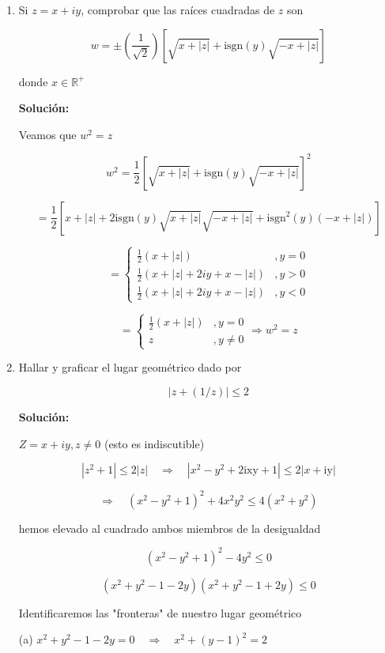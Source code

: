 \documentclass[a4paper,12pt]{article}
\begin{document}
\begin{enumerate}
    \item Si \( z = x + iy \), comprobar que las raíces cuadradas de \( z \) son

\[ w = \pm \left( \frac{1}{\sqrt{2}} \right) [ \sqrt{x + |z|} + \text{isgn}(y) \sqrt{-x + |z|} ] \]

donde \( x \in \mathbb{R}^+ \)

\textbf{Solución:}

Veamos que \( w^2 = z \)

\[ w^2 = \frac{1}{2} [ \sqrt{x + |z|} + \text{isgn}(y) \sqrt{-x + |z|} ]^2 \]

\[ = \frac{1}{2} [ x + |z| + 2 \text{isgn}(y) \sqrt{x + |z|} \sqrt{-x + |z|} + \text{isgn}^2(y) (-x + |z|) ] \]

\[ = \begin{cases}
\frac{1}{2} ( x + |z| ) & , y = 0 \\
\frac{1}{2} ( x + |z| + 2iy + x - |z| ) & , y > 0 \\
\frac{1}{2} ( x + |z| + 2iy + x - |z| ) & , y < 0
\end{cases} \]

\[ = \begin{cases}
\frac{1}{2} ( x + |z| ) & , y = 0 \\
z & , y \neq 0
\end{cases} \Rightarrow w^2 = z \]

    \item Hallar y graficar el lugar geométrico dado por

\[ | z + (1 / z) | \leq 2 \]

\textbf{Solución:}

\( Z = x + iy, z \neq 0 \) (esto es indiscutible)


\[ \left| z^2 + 1 \right| \leq 2 \left| z \right| \quad \Rightarrow \quad \left| x^2 - y^2 + 2 \text{ixy} + 1 \right| \leq 2 \left| x + \text{iy} \right| \]

\[ \Rightarrow \quad (x^2 - y^2 + 1)^2 + 4 x^2 y^2 \leq 4 (x^2 + y^2) \]

hemos elevado al cuadrado ambos miembros de la desigualdad

\[ (x^2 - y^2 + 1)^2 - 4 y^2 \leq 0 \]

\[ (x^2 + y^2 - 1 - 2y)(x^2 + y^2 - 1 + 2y) \leq 0 \]

Identificaremos las "fronteras" de nuestro lugar geométrico

(a) \( x^2 + y^2 - 1 - 2y = 0 \quad \Rightarrow \quad x^2 + (y - 1)^2 = 2 \)


\end{enumerate}
\end{document}
